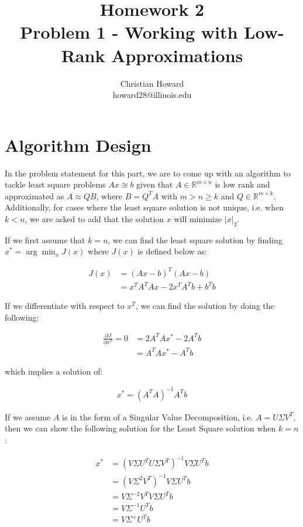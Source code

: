 \documentclass{article}[11pt]
\title{Homework 2 \\ Problem 1 - Working with Low-Rank Approximations}
\author{Christian Howard \\ howard28@illinois.edu }
\date{}
\begin{document}
   \maketitle
   
   \newpage
   
   \tableofcontents
   
   \newpage
   
   \section{Algorithm Design}
   In the problem statement for this part, we are to come up with an algorithm to tackle least square problems $Ax \cong b$ given that $A \in \mathbb{R}^{m \times n}$ is low rank and approximated as $A \approx QB$, where $B = Q^{T}A$ with $m > n \geq k$ and $Q \in \mathbb{R}^{m \times k}$. Additionally, for cases where the least square solution is not unique, i.e. when $k < n$, we are asked to add that the solution $x$ will minimize $|x|_2$. 
   
   If we first assume that $k=n$, we can find the least square solution by finding $x^* = \arg \min_{x} J(x)$ where $J(x)$ is defined below as:
   
   \begin{align*}
   J(x) &= (Ax - b)^T (Ax-b) \\
      &= x^TA^TAx - 2x^T A^T b + b^Tb
   \end{align*}   
   
   If we differentiate with respect to $x^T$, we can find the solution by doing the following:
   
   \begin{align*}
   \frac{\partial J}{\partial x^T} = 0 &= 2A^TAx^* - 2A^T b \\
   &= A^TAx^* - A^T b 
   \end{align*}
   
   which implies a solution of:
   
   \begin{align*}
   x^* = \left(A^T A\right)^{-1} A^Tb
   \end{align*}    
   
  If we assume $A$ is in the form of a Singular Value Decomposition, i.e. $A = U\Sigma V^T$, then we can show the following solution for the Least Square solution when $k = n$:
  
     \begin{align}
   x^* &= \left(V \Sigma U^T U \Sigma V^T\right)^{-1} V \Sigma U^T b \nonumber\\
   &= \left(V \Sigma^2 V^T\right)^{-1} V \Sigma U^T b \nonumber\\
   &= V \Sigma^{-2} V^T V \Sigma U^T b \nonumber\\
   &= V \Sigma^{-1} U^T b \nonumber \\
   &= V \Sigma^{+} U^T b \label{eq:ls1}
   \end{align}    
   
\end{document}
